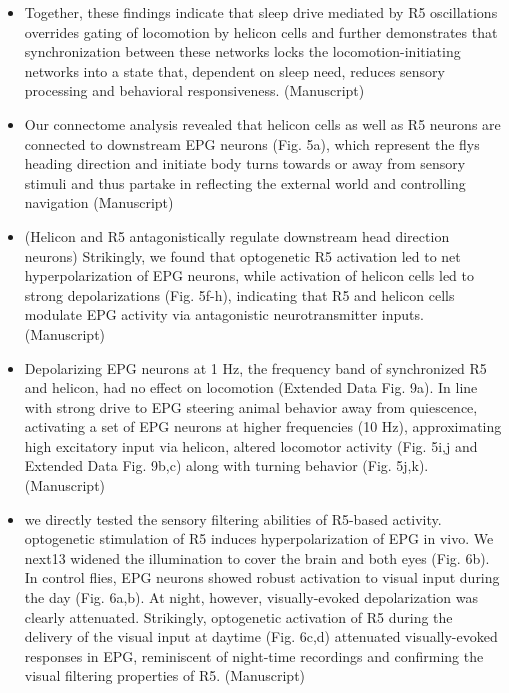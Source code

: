 \documentclass[11pt]{article}
\begin{document}
\begin{itemize}
    \item Together, these findings indicate that sleep drive mediated by R5 oscillations overrides
    gating of locomotion by helicon cells and further demonstrates that synchronization between
    these networks locks the locomotion-initiating networks into a state that, dependent on sleep
    need, reduces sensory processing and behavioral responsiveness.
    \cite{raccugliaCoherentMultilevelNetwork2022} (Manuscript)

    \item  Our connectome analysis revealed that helicon cells
    as well as R5 neurons are connected to downstream EPG neurons (Fig. 5a), which represent
    the flys heading direction and initiate body turns towards or away from sensory stimuli and
    thus partake in reflecting the external world and controlling navigation
    \cite{raccugliaCoherentMultilevelNetwork2022} (Manuscript)

    \item (Helicon and R5 antagonistically regulate downstream head direction neurons) Strikingly, we found that
    optogenetic R5 activation led to net hyperpolarization of EPG neurons, while activation of
    helicon cells led to strong depolarizations (Fig. 5f-h), indicating that R5 and helicon cells
    modulate EPG activity via antagonistic neurotransmitter inputs.
    \cite{raccugliaCoherentMultilevelNetwork2022} (Manuscript)

    \item Depolarizing EPG neurons at 1 Hz, the frequency band of synchronized R5 and helicon, had no
    effect on locomotion (Extended Data Fig. 9a). In line with strong drive to EPG steering animal
    behavior away from quiescence, activating a set of EPG neurons at higher frequencies (10 Hz),
    approximating high excitatory input via helicon, altered locomotor activity (Fig. 5i,j and
    Extended Data Fig. 9b,c) along with turning behavior (Fig. 5j,k).
    \cite{raccugliaCoherentMultilevelNetwork2022} (Manuscript)

    \item we directly tested the sensory filtering abilities of R5-based activity. optogenetic stimulation of
    R5 induces hyperpolarization of EPG in vivo. We next13
    widened the illumination to cover the brain and both eyes (Fig. 6b). In control flies, EPG
    neurons showed robust activation to visual input during the day (Fig. 6a,b). At night, however,
    visually-evoked depolarization was clearly attenuated. Strikingly, optogenetic activation of R5
    during the delivery of the visual input at daytime (Fig. 6c,d) attenuated visually-evoked
    responses in EPG, reminiscent of night-time recordings and confirming the visual filtering
    properties of R5.
    \cite{raccugliaCoherentMultilevelNetwork2022} (Manuscript)


\end{itemize}
\end{document}
